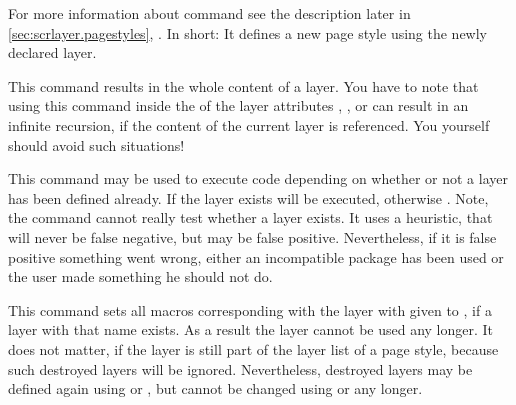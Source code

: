 For more information about command
 see
the description later in \autoref{sec:scrlayer.pagestyles},
. In short: It
defines a new page style using the newly declared layer.%
%
%
%
%
%


\begin{Declaration}
\end{Declaration}
%
This command results in the whole content
of a layer. You have to note that using this
command inside the  of the layer attributes ,
, or  can result in
an infinite recursion, if the content of the current layer is referenced. You
yourself should avoid such situations!%
%

\begin{Declaration}
\end{Declaration}
%
This command may be used to execute code depending on whether or not a layer
has been defined already. If the layer exists  will be
executed, otherwise . Note, the command cannot really
test whether a layer exists. It uses a heuristic, that will never be false
negative, but may be false positive. Nevertheless, if it is false positive
something went wrong, either an incompatible package has been used or the user
made something he should not do.%

\begin{Declaration}
\end{Declaration}
%
This command sets all macros corresponding with the layer with given
 to , if a layer with that name exists. As a result the layer cannot be used any longer. It does not matter, if the layer
is still part of the layer list of a page style, because such destroyed layers
will be ignored. Nevertheless, destroyed layers may be defined again using
 or , but cannot be changed using
 or  any longer. 

